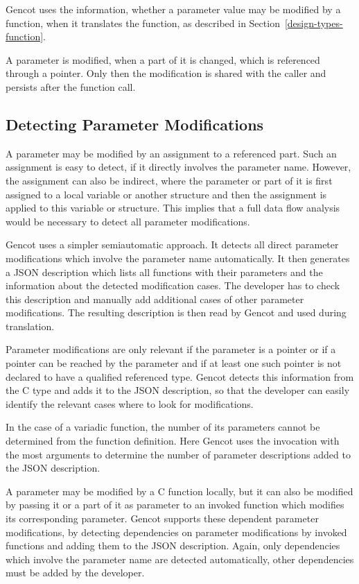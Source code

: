Gencot uses the information, whether a parameter value may be modified by a function, when it translates
the function, as described in Section~\ref{design-types-function}.

A parameter is modified, when a part of it is changed, which is referenced through a pointer. Only then the 
modification is shared with the caller and persists after the function call.

\subsection{Detecting Parameter Modifications}

A parameter may be modified by an assignment to a referenced part. Such an assignment
is easy to detect, if it directly involves the parameter name. However, the assignment can also be indirect, where
the parameter or part of it is first assigned to a local variable or another structure and then the assignment
is applied to this variable or structure. This implies that a full data flow analysis would be necessary
to detect all parameter modifications.

Gencot uses a simpler semiautomatic approach. It detects all direct parameter modifications which involve the 
parameter name automatically. It then generates a JSON description which lists all functions with their parameters
and the information about the detected modification cases. The developer has to check this description and
manually add additional cases of other parameter modifications. The resulting description is then read by
Gencot and used during translation.

Parameter modifications are only relevant if the parameter is a pointer or if a pointer can be reached by the parameter
and if at least one such pointer is not declared to have a  qualified referenced type. Gencot detects
this information from the C type and adds it to the JSON description, so that the developer can easily identify
the relevant cases where to look for modifications.

In the case of a variadic function, the number of its parameters cannot be determined from the function definition.
Here Gencot uses the invocation with the most arguments to determine the number of parameter descriptions added
to the JSON description.

A parameter may be modified by a C function locally, but it can 
also be modified by passing it or a part of it as parameter to an invoked function which modifies its corresponding
parameter. Gencot supports these dependent parameter modifications, by detecting dependencies on parameter
modifications by invoked functions and adding them to the JSON description. Again, only dependencies which
involve the parameter name are detected automatically, other dependencies must be added by the developer.

